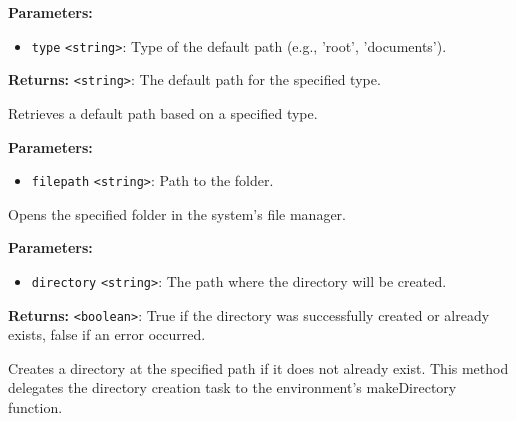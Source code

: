 \documentclass[12pt,a4paper]{article}
\begin{document}
\vspace{5mm}
\noindent {}


\noindent \textbf{Parameters:}
\begin{itemize}
  \item \texttt{type} \texttt{<string>}: Type of the default path (e.g., 'root', 'documents').
\end{itemize}

\noindent \textbf{Returns:} \texttt{<string>}: The default path for the specified type.

\noindent Retrieves a default path based on a specified type.

\vspace{5mm}
\noindent {}


\noindent \textbf{Parameters:}
\begin{itemize}
  \item \texttt{filepath} \texttt{<string>}: Path to the folder.
\end{itemize}

\noindent Opens the specified folder in the system's file manager.

\vspace{5mm}
\noindent {}


\noindent \textbf{Parameters:}
\begin{itemize}
  \item \texttt{directory} \texttt{<string>}: The path where the directory will be created.
\end{itemize}

\noindent \textbf{Returns:} \texttt{<boolean>}: True if the directory was successfully created or already exists, false if an error occurred.

\noindent Creates a directory at the specified path if it does not already exist.
This method delegates the directory creation task to the environment's makeDirectory function.

\vspace{5mm}
\noindent {}
\end{document}
